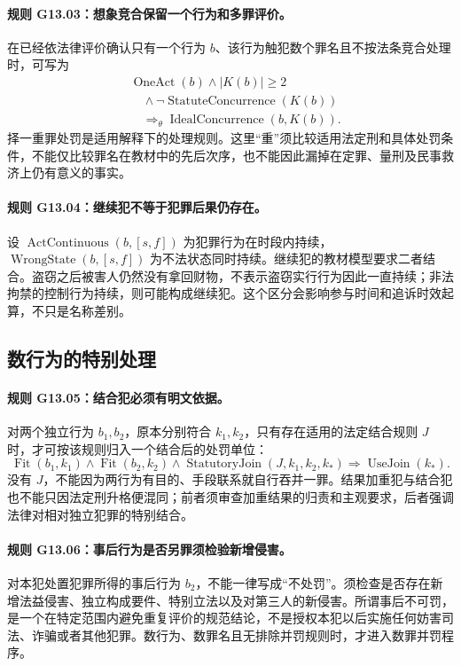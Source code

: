 \paragraph{规则 G13.03：想象竞合保留一个行为和多罪评价。}
在已经依法律评价确认只有一个行为 $b$、该行为触犯数个罪名且不按法条竞合处理时，可写为
\[
\begin{aligned}
&\operatorname{OneAct}(b)\land|K(b)|\ge2\\
&\quad\land\neg\operatorname{StatuteConcurrence}(K(b))\\
&\quad\Longrightarrow_{\theta}\operatorname{IdealConcurrence}(b,K(b)).
\end{aligned}
\]
择一重罪处罚是适用解释下的处理规则。这里“重”须比较适用法定刑和具体处罚条件，不能仅比较罪名在教材中的先后次序，也不能因此漏掉在定罪、量刑及民事救济上仍有意义的事实。

\paragraph{规则 G13.04：继续犯不等于犯罪后果仍存在。}
设 $\operatorname{ActContinuous}(b,[s,f])$ 为犯罪行为在时段内持续，$\operatorname{WrongState}(b,[s,f])$ 为不法状态同时持续。继续犯的教材模型要求二者结合。盗窃之后被害人仍然没有拿回财物，不表示盗窃实行行为因此一直持续；非法拘禁的控制行为持续，则可能构成继续犯。这个区分会影响参与时间和追诉时效起算，不只是名称差别。

\subsection{数行为的特别处理}
\paragraph{规则 G13.05：结合犯必须有明文依据。}
对两个独立行为 $b_1,b_2$，原本分别符合 $k_1,k_2$，只有存在适用的法定结合规则 $J$ 时，才可按该规则归入一个结合后的处罚单位：
\[
\operatorname{Fit}(b_1,k_1)\land\operatorname{Fit}(b_2,k_2)
\land\operatorname{StatutoryJoin}(J,k_1,k_2,k_*)
\Longrightarrow\operatorname{UseJoin}(k_*).
\]
没有 $J$，不能因为两行为有目的、手段联系就自行吞并一罪。结果加重犯与结合犯也不能只因法定刑升格便混同；前者须审查加重结果的归责和主观要求，后者强调法律对相对独立犯罪的特别结合。

\paragraph{规则 G13.06：事后行为是否另罪须检验新增侵害。}
对本犯处置犯罪所得的事后行为 $b_2$，不能一律写成“不处罚”。须检查是否存在新增法益侵害、独立构成要件、特别立法以及对第三人的新侵害。所谓事后不可罚，是一个在特定范围内避免重复评价的规范结论，不是授权本犯以后实施任何妨害司法、诈骗或者其他犯罪。数行为、数罪名且无排除并罚规则时，才进入数罪并罚程序。

